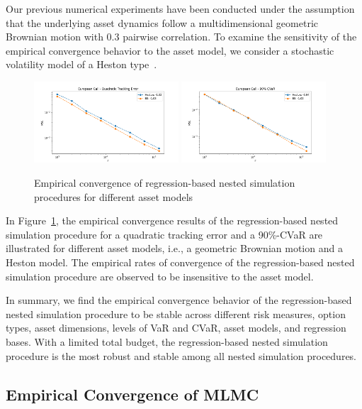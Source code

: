 Our previous numerical experiments have been conducted under the assumption that the underlying asset dynamics follow a multidimensional geometric Brownian motion with $0.3$ pairwise correlation.
To examine the sensitivity of the empirical convergence behavior to the asset model, we consider a stochastic volatility model of a Heston type~\citep{heston1993closed}.

\begin{figure}[ht!] 
    \centering
    \includegraphics[width=0.48\textwidth]{./project1/figures/figure10a.png}
    \includegraphics[width=0.48\textwidth]{./project1/figures/figure10b.png}
    \caption{Empirical convergence of regression-based nested simulation procedures for different asset models}
    \label{fig1:sens_model}
\end{figure}

In Figure~\ref{fig1:sens_model}, the empirical convergence results of the regression-based nested simulation procedure for a quadratic tracking error and a 90\%-CVaR are illustrated for different asset models, i.e., a geometric Brownian motion and a Heston model.
The empirical rates of convergence of the regression-based nested simulation procedure are observed to be insensitive to the asset model.

In summary, we find the empirical convergence behavior of the regression-based nested simulation procedure to be stable across different risk measures, option types, asset dimensions, levels of VaR and CVaR, asset models, and regression bases.
With a limited total budget, the regression-based nested simulation procedure is the most robust and stable among all nested simulation procedures. 

\subsection{Empirical Convergence of MLMC} \label{sec1:empirical-mlmc}

